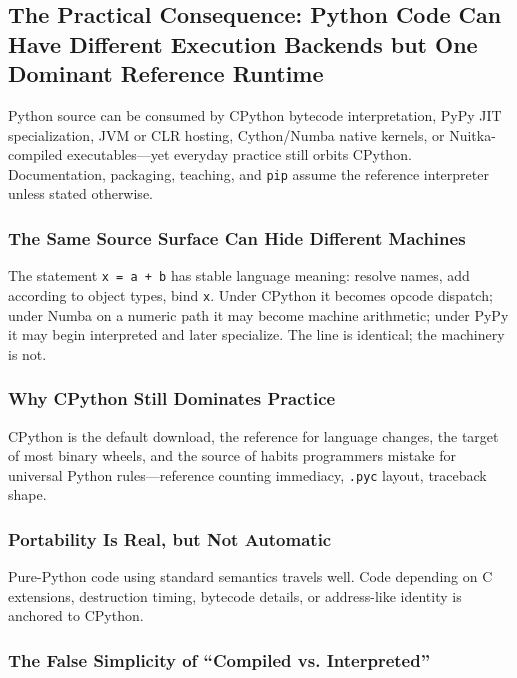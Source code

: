 \subsection{The Practical Consequence: Python Code Can Have Different Execution Backends but One Dominant Reference Runtime}

Python source can be consumed by CPython bytecode interpretation, PyPy JIT specialization, JVM or CLR hosting, Cython/Numba native kernels, or Nuitka-compiled executables---yet everyday practice still orbits CPython. Documentation, packaging, teaching, and \texttt{pip} assume the reference interpreter unless stated otherwise.

\subsubsection{The Same Source Surface Can Hide Different Machines}

The statement \texttt{x = a + b} has stable language meaning: resolve names, add according to object types, bind \texttt{x}. Under CPython it becomes opcode dispatch; under Numba on a numeric path it may become machine arithmetic; under PyPy it may begin interpreted and later specialize. The line is identical; the machinery is not.

\subsubsection{Why CPython Still Dominates Practice}

CPython is the default download, the reference for language changes, the target of most binary wheels, and the source of habits programmers mistake for universal Python rules---reference counting immediacy, \texttt{.pyc} layout, traceback shape.

\subsubsection{Portability Is Real, but Not Automatic}

Pure-Python code using standard semantics travels well. Code depending on C extensions, destruction timing, bytecode details, or address-like identity is anchored to CPython.

\subsubsection{The False Simplicity of “Compiled vs. Interpreted”}

